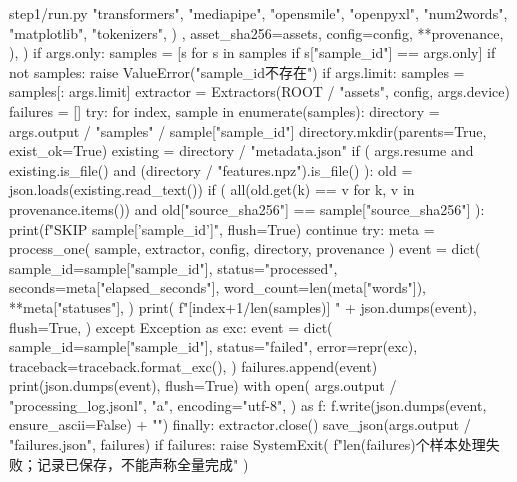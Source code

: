 \begin{appendices}
\begin{Python}{step1/run.py}
{                    "transformers",
                    "mediapipe",
                    "opensmile",
                    "openpyxl",
                    "num2words",
                    "matplotlib",
                    "tokenizers",
                )
            },
            asset_sha256=assets,
            config=config,
            **provenance,
        ),
    )
    if args.only:
        samples = [s for s in samples if s["sample_id"] == args.only]
        if not samples:
            raise ValueError("sample_id不存在")
    if args.limit:
        samples = samples[: args.limit]
    extractor = Extractors(ROOT / "assets", config, args.device)
    failures = []
    try:
        for index, sample in enumerate(samples):
            directory = args.output / "samples" / sample["sample_id"]
            directory.mkdir(parents=True, exist_ok=True)
            existing = directory / "metadata.json"
            if (
                args.resume
                and existing.is_file()
                and (directory / "features.npz").is_file()
            ):
                old = json.loads(existing.read_text())
                if (
                    all(old.get(k) == v for k, v in provenance.items())
                    and old["source_sha256"] == sample["source_sha256"]
                ):
                    print(f"SKIP {sample['sample_id']}", flush=True)
                    continue
            try:
                meta = process_one(
                    sample, extractor, config, directory, provenance
                )
                event = dict(
                    sample_id=sample["sample_id"],
                    status="processed",
                    seconds=meta["elapsed_seconds"],
                    word_count=len(meta["words"]),
                    **meta["statuses"],
                )
                print(
                    f"[{index+1}/{len(samples)}] " + json.dumps(event),
                    flush=True,
                )
            except Exception as exc:
                event = dict(
                    sample_id=sample["sample_id"],
                    status="failed",
                    error=repr(exc),
                    traceback=traceback.format_exc(),
                )
                failures.append(event)
                print(json.dumps(event), flush=True)
            with open(
                args.output / "processing_log.jsonl",
                "a",
                encoding="utf-8",
            ) as f:
                f.write(json.dumps(event, ensure_ascii=False) + "\n")
    finally:
        extractor.close()
    save_json(args.output / "failures.json", failures)
    if failures:
        raise SystemExit(
            f"{len(failures)}个样本处理失败；记录已保存，不能声称全量完成"
        )



\end{Python}
\end{appendices}
